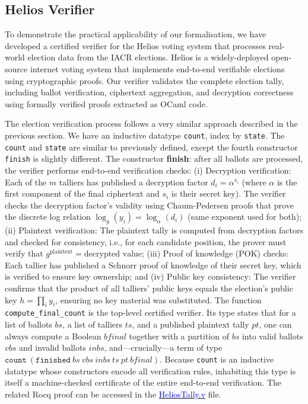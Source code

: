 \documentclass[sigconf, anonymous]{acmart}
\begin{document}
\subsection{Helios Verifier}
To demonstrate the practical applicability of our formalisation, we have developed a certified verifier for 
the Helios voting system that processes real-world election data from the IACR elections. Helios is a 
widely-deployed open-source internet voting system that implements end-to-end verifiable elections using 
cryptographic proofs. Our verifier validates the complete election tally, including ballot verification, ciphertext aggregation, and decryption correctness using formally verified proofs 
extracted as OCaml code. 

The election verification process follows a very similar approach described in the 
previous section. We have an inductive datatype \texttt{count}, index by \texttt{state}. 
The \texttt{count} and \texttt{state} are similar to previously defined, except the fourth constructor \texttt{finish} is 
slightly different. The constructor \textbf{finish}: after all ballots are processed, the verifier performs end-to-end 
verification checks: (i) Decryption verification: Each of the $m$ talliers has published a decryption factor $d_i = \alpha^{s_i}$ 
(where $\alpha$ is the first component of the final ciphertext and $s_i$ is their secret key). The verifier 
checks the decryption factor's validity using Chaum-Pedersen proofs that prove the discrete log relation 
$\log_g(y_i) = \log_\alpha(d_i)$ (same exponent used for both); (ii) Plaintext verification: The plaintext tally is computed from decryption factors and checked for 
consistency, i.e., for each candidate position, the prover must verify that $g^{\text{plaintext}} = \text{decrypted value}$; (iii) Proof of knowledge (POK) checks: Each tallier has published a Schnorr proof of knowledge of their 
secret key, which is verified to ensure key ownership; and (iv) Public key consistency: The verifier confirms that the product of all talliers' public keys equals 
the election's public key $h = \prod_i y_i$, ensuring no key material was substituted.  The function \texttt{compute\_final\_count} is the top-level certified
verifier. Its type states that for a list of ballots $\mathit{bs}$,
a list of talliers $\mathit{ts}$, and a published plaintext
tally $\mathit{pt}$, one can always compute a Boolean $\mathit{bfinal}$ together
with a partition of $\mathit{bs}$ into valid ballots $\mathit{vbs}$ and invalid
ballots $\mathit{inbs}$, and---crucially---a term of type
$\texttt{count}~(\texttt{finished}~\mathit{bs}~\mathit{vbs}~\mathit{inbs}~\mathit{ts}~\mathit{pt}~\mathit{bfinal})$.
Because \texttt{count} is an inductive datatype whose constructors encode all
verification rules, inhabiting this type is itself a machine-checked
certificate of the entire end-to-end verification. The related Rocq proof can be accessed in the \href{https://anonymous.4open.science/r/SigmaProtocol-EBA5/src/Backend/HeliosTally.v}{\textcolor{blue}{HeliosTally.v}} file.
\end{document}
